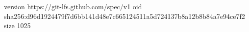version https://git-lfs.github.com/spec/v1
oid sha256:d96d1924479f7d6bb141d48e7c665124511a5d724137b8a12b8b84a7e94ce7f2
size 1025
